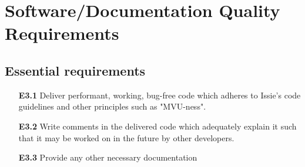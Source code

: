 

\section{Software/Documentation Quality Requirements}
\subsection*{Essential requirements}
\begin{itemize}
    \item[\textbf{E3.1}] Deliver performant, working, bug-free code which adheres to Issie's code guidelines and other principles such as "MVU-ness".
    \medskip
    \item[\textbf{E3.2}] Write comments in the delivered code which adequately explain it such that it may be worked on in the future by other developers. 
    \medskip
    \item[\textbf{E3.3}] Provide any other necessary documentation
\end{itemize}

